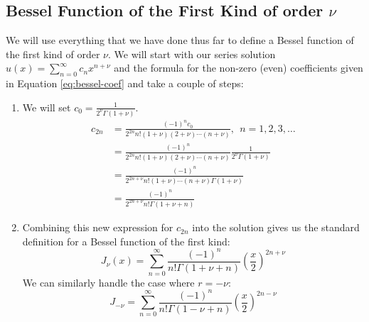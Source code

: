 \subsection{Bessel Function of the First Kind of order $\nu$}
We will use everything that we have done thus far to define a Bessel function of the first kind of order $\nu$.  We will start with our series solution $u(x) = \sum_{n=0}^{\infty}c_n{x^{n+\nu}}$ and the formula for the non-zero (even) coefficients given in Equation \ref{eq:bessel-coef} and take a couple of steps:
\begin{enumerate}
\item We will set $c_0 = \frac{1}{2^{\nu}\Gamma(1+\nu)}$.
\begin{align*}
c_{2n} &= \frac{(-1)^n c_0}{2^{2n}n!(1+\nu)(2+\nu)\cdots(n+\nu)}, \ \ n=1,2,3,\dots \\
&= \frac{(-1)^n}{2^{2n}n!(1+\nu)(2+\nu)\cdots(n+\nu)}\frac{1}{2^{\nu}\Gamma(1+\nu)} \\
&= \frac{(-1)^n}{2^{2n+\nu}n!(1+\nu)\cdots(n+\nu)\Gamma(1+\nu)} \\
&= \frac{(-1)^n}{2^{2n+\nu}n!\Gamma(1+\nu+n)}
\end{align*}  
\item Combining this new expression for $c_{2n}$ into the solution gives us the standard definition for a Bessel function of the first kind:
\begin{equation}
J_{\nu}(x) = \sum\limits_{n=0}^{\infty}\frac{(-1)^n}{n!\Gamma(1+\nu+n)}\left(\frac{x}{2}\right)^{2n+\nu}
\label{eq:beq-first-kind-order-nu}
\end{equation}
We can similarly handle the case where $r = -\nu$:
\begin{equation*}
J_{-\nu} = \sum\limits_{n=0}^{\infty}\frac{(-1)^n}{n!\Gamma(1-\nu+n)}\left(\frac{x}{2} \right)^{2n-\nu}
\end{equation*}

\end{enumerate}
